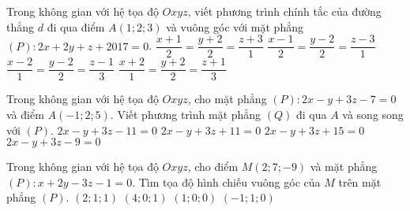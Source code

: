 \begin{ex}%
	Trong không gian với hệ tọa độ $Oxyz$, viết phương trình chính tắc của đường thẳng $d$ đi qua điểm $A(1;2;3)$ và vuông góc với mặt phẳng $(P)\colon 2x+2y+z+2017=0$.
	\choice
	{$\dfrac{x+1}{2}=\dfrac{y+2}{2}=\dfrac{z+3}{1}$}
	{\True $\dfrac{x-1}{2}=\dfrac{y-2}{2}=\dfrac{z-3}{1}$}
	{$\dfrac{x-2}{1}=\dfrac{y-2}{2}=\dfrac{z-1}{3}$}
	{$\dfrac{x+2}{1}=\dfrac{y+2}{2}=\dfrac{z+1}{3}$}
\end{ex}
\begin{ex}%
	Trong không gian với hệ tọa độ $Oxyz$, cho mặt phẳng $(P)\colon 2x-y+3z-7=0$ và điểm $A(-1;2;5)$. Viết phương trình mặt phẳng $(Q)$ đi qua $A$ và song song với $(P)$.
	\choice
	{\True $2x-y+3z-11=0$}
	{$2x-y+3z+11=0$}
	{$2x-y+3z+15=0$}
	{$2x-y+3z-9=0$}
\end{ex}
\begin{ex}%
	Trong không gian với hệ tọa độ $Oxyz$, cho điểm $M(2;7;-9)$ và mặt phẳng $(P)\colon x+2y-3z-1=0$. Tìm tọa độ hình chiếu vuông góc của $M$ trên mặt phẳng $(P)$.
	\choice
	{$(2;1;1)$}
	{$(4;0;1)$}
	{$(1;0;0)$}
	{\True $(-1;1;0)$}
\end{ex}
